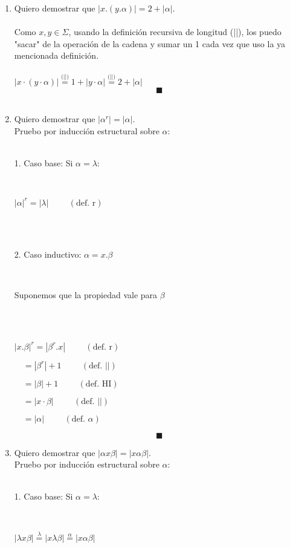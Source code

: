 \documentclass[12pt]{article}
\begin{document}
\begin{enumerate}[label=\roman*.,font=\itshape]
    \item Quiero demostrar que $|x.(y.\alpha)| = 2 + |\alpha|$.
    \\
    \\
    {Como $x,y \in \Sigma$, usando la definición recursiva de longitud (||), los puedo "sacar" de la operación de la cadena y sumar un 1 cada vez que uso la ya mencionada definición.}
    \\
    \\
$|x\cdot(y\cdot\alpha)|\overset{\text{(||)}}{=} 1 + |y\cdot\alpha|\overset{\text{(||)}}{=} 2 + |\alpha|$
    \[
    \blacksquare
    \]
    \\ 
    \item Quiero demostrar que $|\alpha^r|=|\alpha|$. \\ 
    Pruebo por inducción estructural sobre $\alpha$: 
    \\
    \\
    \centerline{1. Caso base: Si $\alpha = \lambda$:}
    \\
    \centerline{$|\alpha|^r =|\lambda| \hspace{1cm} (\text{def. r} )$}
    \\
    \\
    \centerline{2. Caso inductivo: $\alpha = x.\beta$}
    \\
    \centerline{Suponemos que la propiedad vale para $\beta$}
    \\
    \\
    \centerline{$|x.\beta|^r = |\beta^r.x| \hspace{1cm} (\text{def. r})$}
    \centerline{$\quad = |\beta^r| + 1 \hspace{1cm} (\text{def. ||})$}
    \centerline{$\quad = |\beta| + 1 \hspace{1cm} (\text{def. HI})$}
    \centerline{$\quad = |x\cdot\beta| \hspace{1cm} (\text{def. ||})$}
    \centerline{$\quad = |\alpha| \hspace{1cm} (\text{def. $\alpha$})$}
    \[
    \blacksquare
    \]
    \item Quiero demostrar que $|\alpha x \beta| = |x \alpha \beta|$. \\
    Pruebo por inducción estructural sobre $\alpha$:
    \\
    \\
    \centerline{1. Caso base: Si $\alpha = \lambda$:}
    \\
    \centerline{$|\lambda x\beta| \overset{\text{$\lambda$}}{=} |x\lambda\beta| \overset{\text{$\alpha$}}{=} |x\alpha\beta|$}

\end{enumerate}
\end{document}
